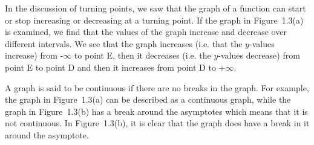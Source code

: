       \label{m39337*uid52}
            \nopagebreak
        \label{m39337*id236961}In the discussion of turning points, we saw that the graph of a function can start or stop increasing or decreasing at a turning point. If the graph in Figure~1.3(a) is examined, we find that the values of the graph increase and decrease over different intervals. We see that the graph increases (i.e. that the $y$-values increase) from -$\infty $ to point E, then it decreases (i.e. the $y$-values decrease) from point E to point D and then it increases from point D to +$\infty $.\par 
      \label{m39337*uid53}
            \nopagebreak
        \label{m39337*id237022}A graph is said to be continuous if there are no breaks in the graph. For example, the graph in Figure~1.3(a) can be described as a continuous graph, while the graph in Figure~1.3(b) has a break around the asymptotes which means that it is not continuous.
In Figure~1.3(b), it is clear that the graph does have a break in it around the asymptote.\par 
\label{m39337*secfhsst!!!underscore!!!id796}
            \nopagebreak
